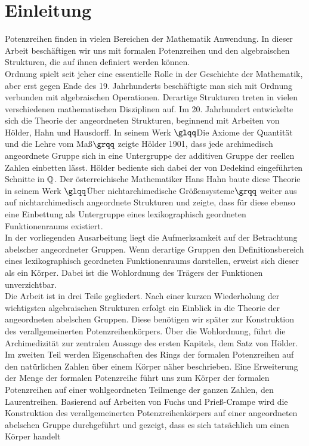 \chapter{Einleitung}
%
Potenzreihen finden in vielen Bereichen der Mathematik Anwendung. In dieser Arbeit beschäftigen wir uns mit formalen Potenzreihen und den algebraischen Strukturen, die auf ihnen definiert werden können. \\
Ordnung spielt seit jeher eine essentielle Rolle in der Geschichte der Mathematik, aber erst gegen Ende des 19. Jahrhunderts beschäftigte man sich mit Ordnung verbunden mit algebraischen Operationen. Derartige Strukturen treten in vielen verschiedenen mathematischen Disziplinen auf. Im 20. Jahrhundert entwickelte sich die Theorie der angeordneten Strukturen, beginnend mit Arbeiten von Hölder, Hahn und Hausdorff. In seinem Werk $\glqq$Die Axiome der Quantität und die Lehre vom Maß$\grqq$ zeigte Hölder 1901, dass jede archimedisch angeordnete Gruppe sich in eine Untergruppe der additiven Gruppe der reellen Zahlen einbetten lässt. Hölder bediente sich dabei der von Dedekind eingeführten Schnitte in $\mathbb{Q}$. Der österreichische Mathematiker Hans Hahn baute diese Theorie in seinem Werk $\glqq$Über nichtarchimedische Größensysteme$\grqq$ weiter aus auf nichtarchimedisch angeordnete Strukturen und zeigte, dass für diese ebenso eine Einbettung als Untergruppe eines lexikographisch geordneten Funktionenraums existiert. \\
In der vorliegenden Ausarbeitung liegt die Aufmerksamkeit auf der Betrachtung abelscher angeordneter Gruppen. Wenn derartige Gruppen den Definitionsbereich eines lexikographisch geordneten Funktionenraums darstellen, erweist sich dieser als ein Körper. Dabei ist die Wohlordnung des Trägers der Funktionen unverzichtbar.  \\
Die Arbeit ist in drei Teile gegliedert. Nach einer kurzen Wiederholung der wichtigsten algebraischen Strukturen erfolgt ein Einblick in die Theorie der angeordneten abelschen Gruppen. Diese benötigen wir später zur Konstruktion des verallgemeinerten Potenzreihenkörpers. Über die Wohlordnung, führt die Archimedizität zur zentralen Aussage des ersten Kapitels, dem Satz von Hölder. Im zweiten Teil werden Eigenschaften des Rings der formalen Potenzreihen auf den natürlichen Zahlen über einem Körper näher beschrieben. Eine Erweiterung der Menge der formalen Potenzreihe führt uns zum Körper der formalen Potenzreihen auf einer wohlgeordneten Teilmenge der ganzen Zahlen, den Laurentreihen. Basierend auf Arbeiten von Fuchs und Prieß-Crampe wird die Konstruktion des verallgemeinerten Potenzreihenkörpers auf einer angeordneten abelschen Gruppe durchgeführt und gezeigt, dass es sich tatsächlich um einen Körper handelt




